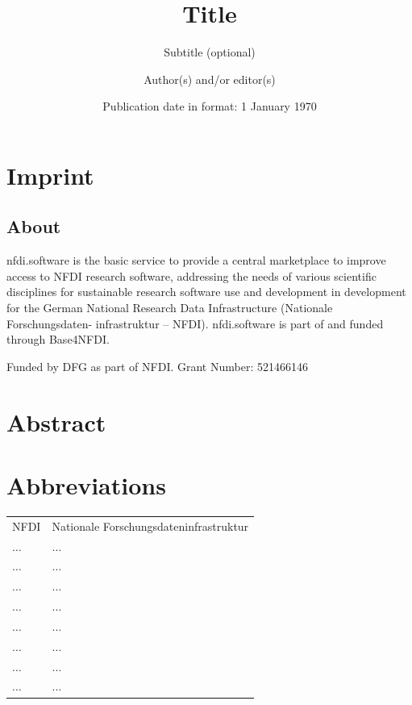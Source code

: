 \documentclass[headsepline,titlepage,twoside,12pt]{scrreprt}
\author{Author(s) and/or editor(s)}
\date{Publication date in format: 1 January 1970}
\title{Title}
\subtitle{Subtitle (optional)}
\begin{document}
\allowdisplaybreaks%


\maketitle

\chapter*{Imprint}\label{ch:introduction}
\section{About}
nfdi.software is the basic service to provide a central marketplace to improve access to NFDI research software, addressing the needs of various scientific disciplines for sustainable research software use and development in development for the German National Research Data Infrastructure (Nationale Forschungsdaten-
infrastruktur – NFDI).
nfdi.software is part of and funded through Base4NFDI.

Funded by DFG as part of NFDI. Grant Number: 521466146

\chapter*{Abstract}\label{ch:abstract}

\chapter*{Abbreviations}
\begin{tabularx}{\textwidth}{lX}
NFDI					&Nationale Forschungsdateninfrastruktur\\
$\ldots$				&$\ldots$\\
$\ldots$				&$\ldots$\\
$\ldots$				&$\ldots$\\
$\ldots$				&$\ldots$\\
$\ldots$				&$\ldots$\\
$\ldots$				&$\ldots$\\
$\ldots$				&$\ldots$\\
$\ldots$				&$\ldots$\\
\end{tabularx}
\end{document}
